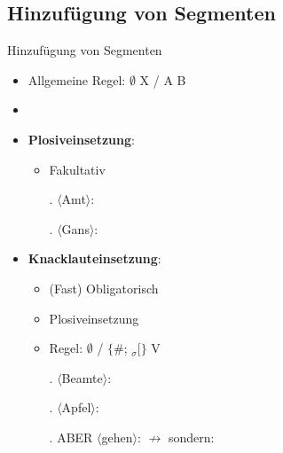 %
\subsection{Hinzufügung von Segmenten}
%

\begin{frame}{Hinzufügung von Segmenten}

\begin{itemize}
	\item Allgemeine Regel: $\emptyset$ \ras X / A \underline{\quad} B
	\item[]
	\item \textbf{Plosiveinsetzung}:
	
	\begin{itemize}
		\item Fakultativ

		\ex. $\langle$Amt$\rangle$:  \ras \textipa{[Pampt]}
		
		\ex. $\langle$Gans$\rangle$:  \ras \textipa{[gants]}

	\end{itemize}

	\item \textbf{Knacklauteinsetzung}:

	\begin{itemize}
		\item (Fast) Obligatorisch
		\item Plosiveinsetzung
		\item Regel: $\emptyset$ \ras \textipa{[P]} / 
		$\{$\#; \textprimstress$_\sigma[\}$ 
\underline{\quad} V

		\ex. $\langle$Beamte$\rangle$:  \ras {}
		
		\ex. $\langle$Apfel$\rangle$:  \ras \textipa{[Pa\t{pf}@l]}
		
		\ex. ABER $\langle$gehen$\rangle$:  $\nrightarrow$ \textipa{[\textprimstress ge:.P@n]} sondern: \textipa{[\textprimstress ge:.@n]}

	\end{itemize}
			
\end{itemize}

\end{frame}



